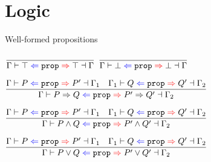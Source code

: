\section{Logic}

\begin{frame}{Well-formed propositions}

\begin{center}
  $\infrule{}{\checkprop{\Gamma}{\True}{\True}{\Gamma}}$ \quad
  $\infrule{}{\checkprop{\Gamma}{\False}{\False}{\Gamma}}$

  \vspace{2em}

  $\infrule{\checkprop{\Gamma}{P}{P'}{\Gamma_1} \quad \checkprop{\Gamma_1}{Q}{Q'}{\Gamma_2}}{\checkprop{\Gamma}{\Impl{P}{Q}}{\Impl{P'}{Q'}}{\Gamma_2}}$

  \vspace{2em}

  $\infrule{\checkprop{\Gamma}{P}{P'}{\Gamma_1} \quad \checkprop{\Gamma_1}{Q}{Q'}{\Gamma_2}}{\checkprop{\Gamma}{\And{P}{Q}}{\And{P'}{Q'}}{\Gamma_2}}$

  \vspace{2em}

  $\infrule{\checkprop{\Gamma}{P}{P'}{\Gamma_1} \quad \checkprop{\Gamma_1}{Q}{Q'}{\Gamma_2}}{\checkprop{\Gamma}{\Or{P}{Q}}{\Or{P'}{Q'}}{\Gamma_2}}$
\end{center}

\end{frame}

